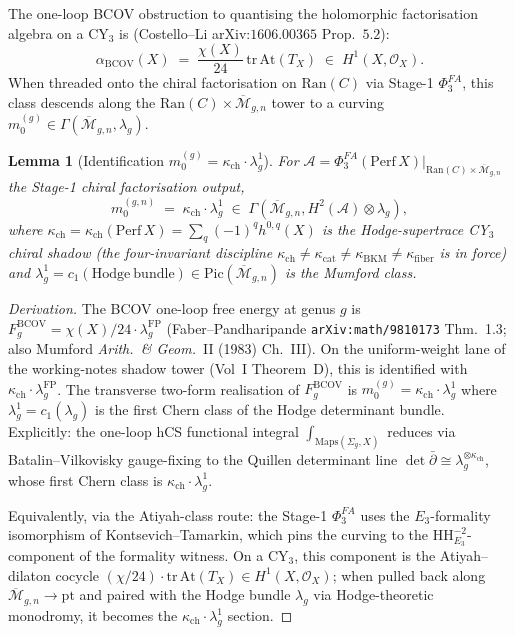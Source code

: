 \documentclass[11pt]{amsart}
\newtheorem{lemma}[theorem]{Lemma}
\newcommand{\kch}{\kappa_{\mathrm{ch}}}
\newcommand{\kcat}{\kappa_{\mathrm{cat}}}
\newcommand{\kBKM}{\kappa_{\mathrm{BKM}}}
\newcommand{\kfib}{\kappa_{\mathrm{fiber}}}
\newcommand{\cO}{\mathcal{O}}
\newcommand{\cA}{\mathcal{A}}
\newcommand{\Ran}{\mathrm{Ran}}
\newcommand{\Mbar}{\overline{\mathcal{M}}}
\newcommand{\Perf}{\mathrm{Perf}}
\newcommand{\HH}{\mathrm{HH}}
\newcommand{\At}{\mathrm{At}}
\newcommand{\tr}{\mathrm{tr}}
\begin{document}
The one-loop BCOV obstruction to quantising the holomorphic
factorisation algebra on a CY$_3$ is (Costello--Li arXiv:$1606.00365$
Prop.~$5.2$):
\[
\alpha_{\mathrm{BCOV}}(X) \;=\; \frac{\chi(X)}{24}\,\tr\,\At(T_X)
\;\in\; H^1(X, \cO_X).
\]
When threaded onto the chiral factorisation on $\Ran(C)$ via
Stage-1 $\Phi^{FA}_3$, this class descends along the
$\Ran(C) \times \Mbar_{g,n}$ tower to a curving $m_0^{(g)} \in
\Gamma(\Mbar_{g,n}, \lambda_g)$.

\begin{lemma}[Identification $m_0^{(g)} = \kch \cdot \lambda_g^1$]
\label{lem:curving-identification}
For $\cA = \Phi^{FA}_3(\Perf\,X)|_{\Ran(C)\times\Mbar_{g,n}}$ the
Stage-1 chiral factorisation output,
\[
m_0^{(g,n)} \;=\; \kch \cdot \lambda_g^1 \;\in\;
\Gamma(\Mbar_{g,n}, H^2(\cA) \otimes \lambda_g),
\]
where $\kch = \kch(\Perf\,X) = \sum_q (-1)^q h^{0,q}(X)$ is the
Hodge-supertrace CY$_3$ chiral shadow (the four-invariant discipline
$\kch \neq \kcat \neq \kBKM \neq \kfib$ is in force) and $\lambda_g^1
= c_1(\mathrm{Hodge\ bundle}) \in \mathrm{Pic}(\Mbar_{g,n})$ is the
Mumford class.
\end{lemma}

\begin{proof}[Derivation]
The BCOV one-loop free energy at genus $g$ is
$F_g^{\mathrm{BCOV}} = \chi(X)/24 \cdot \lambda_g^{\mathrm{FP}}$
(Faber--Pandharipande \texttt{arXiv:math/9810173} Thm.~1.3; also
Mumford \emph{Arith.\ \& Geom.}\ II (1983) Ch.\ III). On the
uniform-weight lane of the working-notes shadow tower (Vol~I
Theorem~D), this is identified with $\kch \cdot \lambda_g^{\mathrm{FP}}$.
The transverse two-form realisation of $F_g^{\mathrm{BCOV}}$ is
$m_0^{(g)} = \kch \cdot \lambda_g^1$ where $\lambda_g^1 =
c_1(\lambda_g)$ is the first Chern class of the Hodge determinant
bundle. Explicitly: the one-loop hCS functional integral
$\int_{\mathrm{Maps}(\Sigma_g, X)}$ reduces via Batalin--Vilkovisky
gauge-fixing to the Quillen determinant line $\det\bar\partial
\cong \lambda_g^{\otimes \kch}$, whose first Chern class is
$\kch \cdot \lambda_g^1$.

Equivalently, via the Atiyah-class route: the Stage-1
$\Phi^{FA}_3$ uses the $E_3$-formality isomorphism of
Kontsevich--Tamarkin, which pins the curving to the
$\HH^{-2}_{E_3}$-component of the formality witness. On a
CY$_3$, this component is the Atiyah--dilaton cocycle
$(\chi/24) \cdot \tr\,\At(T_X) \in H^1(X, \cO_X)$; when pulled back
along $\Mbar_{g,n} \to \mathrm{pt}$ and paired with the Hodge bundle
$\lambda_g$ via Hodge-theoretic monodromy, it becomes the
$\kch \cdot \lambda_g^1$ section.
\end{proof}
\end{document}
